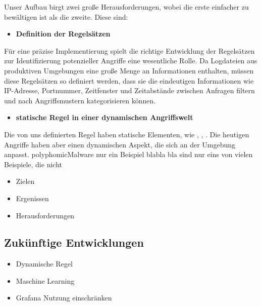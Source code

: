 
Unser Aufbau birgt zwei große Herausforderungen, wobei die erste einfacher zu bewältigen ist als die zweite. Diese sind:

\begin{itemize}[noitemsep]
    \item \textbf{Definition der Regelsätzen}
\end{itemize}


Für eine präzise Implementierung spielt die richtige Entwicklung der Regelsätzen zur Identifizierung potenzieller Angriffe eine wesentliche Rolle. Da Logdateien aus produktiven Umgebungen eine große Menge an Informationen enthalten, müssen diese Regelsätzen so definiert werden, dass sie die eindeutigen Informationen wie IP-Adresse, Portnummer, Zeitfenster und Zeitabstände zwischen Anfragen filtern und nach Angriffsmustern kategorisieren können.

\begin{itemize}[noitemsep]
    \item \textbf{statische Regel in einer dynamischen Angriffswelt}
\end{itemize}

Die von uns definierten Regel haben statische Elementen, wie , , . Die heutigen Angriffe haben aber einen dynamischen Aspekt, die sich an der Umgebung anpasst. \gls{polyphomicMalware} nur ein Beispiel blabla bla
sind nur eins von vielen Beispiele, die nicht 

\begin{itemize}[noitemsep]
    \item Zielen
    \item Ergenissen
    \item Herausforderungen
 \end{itemize}
 
\subsection{Zukünftige Entwicklungen}

\begin{itemize}[noitemsep]
    \item Dynamische Regel
    \item Maschine Learning
    \item Grafana Nutzung einschränken
 \end{itemize}
 
